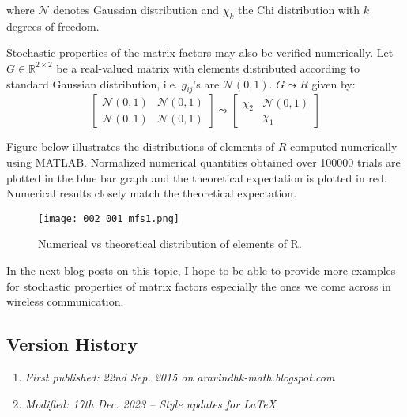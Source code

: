 where $\mathcal{N}$ denotes Gaussian distribution and $\chi_k$ the Chi distribution with $k$ degrees of freedom.

Stochastic properties of the matrix factors may also be verified numerically. Let $G \in \mathbb{R}^{2 \times 2}$ be a real-valued matrix with elements distributed according to standard Gaussian distribution, i.e. $g_{ij}$'s are $\mathcal{N}(0,1)$. $G \leadsto R$ given by:
$$
\begin{bmatrix}
	\mathcal{N}(0,1) & \mathcal{N}(0,1) \\
	\mathcal{N}(0,1) & \mathcal{N}(0,1)
\end{bmatrix} \leadsto
\begin{bmatrix}
	\chi_2 & \mathcal{N}(0,1) \\
	& \chi_1
\end{bmatrix}
$$

Figure below illustrates the distributions of elements of $R$ computed numerically using MATLAB. Normalized numerical quantities obtained over 100000 trials are plotted in the blue bar graph and the theoretical expectation is plotted in red. Numerical results closely match the theoretical expectation.

\begin{figure}[H]
	\centering
	\texttt{[image: 002\_001\_mfs1.png]}
	\caption{Numerical vs theoretical distribution of elements of R.}
\end{figure}

In the next blog posts on this topic, I hope to be able to provide more examples for stochastic properties of matrix factors especially the ones we come across in wireless communication.

\subsection{Version History}
\begin{enumerate}
	\item \emph{First published: 22nd Sep. 2015 on aravindhk-math.blogspot.com}
	\item \emph{Modified: 17th Dec. 2023 -- Style updates for \LaTeX}
\end{enumerate}
